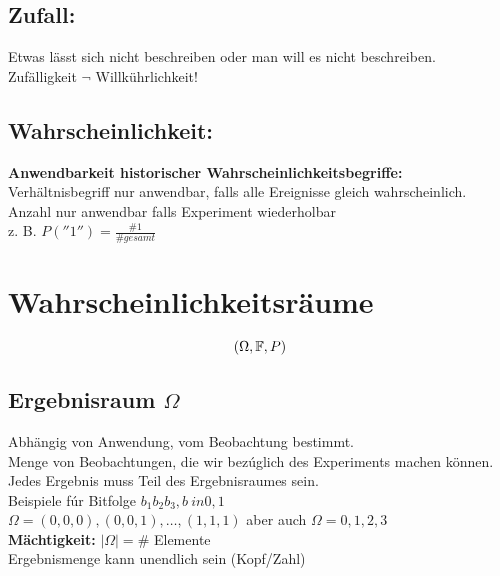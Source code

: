 \documentclass[german]{latex4ei/latex4ei_sheet}
\begin{document}
\subsection{Zufall:} Etwas l\"asst sich nicht beschreiben oder man will es nicht beschreiben.\\
Zuf\"alligkeit $\neg$ Willk\"uhrlichkeit!\\
\subsection{Wahrscheinlichkeit:}
\textbf{Anwendbarkeit historischer Wahrscheinlichkeitsbegriffe:}\\
Verh\"altnisbegriff nur anwendbar, falls alle Ereignisse gleich wahrscheinlich.\\
Anzahl nur anwendbar falls Experiment wiederholbar\\
z. B. $P(''1'')=\frac{\# 1}{\# gesamt}$
\section{Wahrscheinlichkeitsr\"aume}

\[(\Omega,\operatorname{\mathbb F},P)\]

\subsection{Ergebnisraum $\Omega$}
Abh\"angig von Anwendung, vom Beobachtung bestimmt.\\
Menge von Beobachtungen, die wir bez\'uglich des Experiments machen k\"onnen. Jedes Ergebnis muss Teil des Ergebnisraumes sein.\\
Beispiele f\'ur Bitfolge $b_1b_2b_3, b\ in {0,1}$\\
$\Omega={(0,0,0),(0,0,1),\ldots,(1,1,1)}$ aber auch $\Omega={0,1,2,3}$\\
\textbf{M\"achtigkeit:} $|\Omega|=\#	$ Elemente\\
Ergebnismenge kann unendlich sein (Kopf/Zahl)
\end{document}
